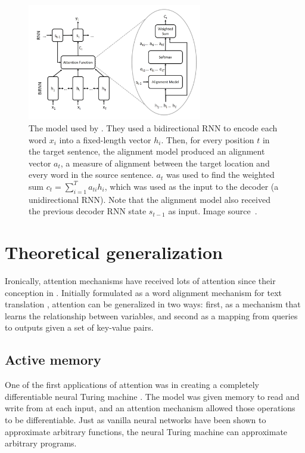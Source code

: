 \documentclass{article}
\begin{document}
\begin{figure}
    \centering
    \includegraphics[width=3in]{figures/rnn_search.png}
    \caption{The model used by \protect\cite{joint_align_translate}. They used a bidirectional RNN to encode each word $x_i$ into a fixed-length vector $h_i$. Then, for every position $t$ in the target sentence, the alignment model produced an alignment vector $a_t$, a measure of alignment between the target location and every word in the source sentence. $a_t$ was used to find the weighted sum $c_t=\sum_{i=1}^Ta_{ti}h_i$, which was used as the input to the decoder (a unidirectional RNN). Note that the alignment model also received the previous decoder RNN state $s_{t-1}$ as input. Image source~\protect\cite{attention_please}.}\label{figure:rnn_search}
\end{figure}

\section{Theoretical generalization}

Ironically, attention mechanisms have received lots of attention since their conception in \citeyear{joint_align_translate}. Initially formulated as a word alignment mechanism for text translation \cite{joint_align_translate}, attention can be generalized in two ways: first, as a mechanism that learns the relationship between variables, and second as a mapping from queries to outputs given a set of key-value pairs.



\subsection{Active memory}

One of the first applications of attention was in creating a completely differentiable neural Turing machine \cite{neural_turing}. The model was given memory to read and write from at each input, and an attention mechanism allowed those operations to be differentiable. Just as vanilla neural networks have been shown to approximate arbitrary functions, the neural Turing machine can approximate arbitrary programs.
\end{document}
